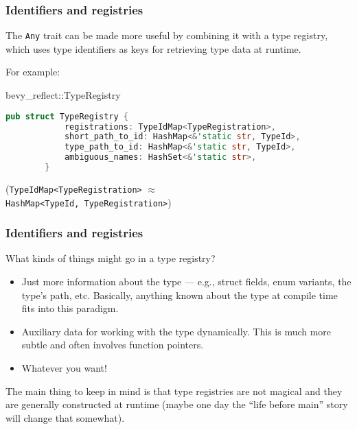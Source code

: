 \documentclass[10pt]{beamer}
\begin{document}
\begin{frame}[fragile]
    \frametitle{Identifiers and registries}
    The \texttt{Any} trait can be made more useful by combining it with a type registry, which uses type identifiers as keys for retrieving type data at runtime. \pause
    
    For example:
    
	\begin{block}{bevy\_reflect::TypeRegistry}
	\begin{lstlisting}[language=Rust, gobble=8]
        pub struct TypeRegistry {
            registrations: TypeIdMap<TypeRegistration>,
            short_path_to_id: HashMap<&'static str, TypeId>,
            type_path_to_id: HashMap<&'static str, TypeId>,
            ambiguous_names: HashSet<&'static str>,
        }
	\end{lstlisting}
	\end{block}
	
	(\texttt{TypeIdMap<TypeRegistration>} $\approx$ \\ \texttt{HashMap<TypeId, TypeRegistration>})
	
\end{frame}

\begin{frame}
    \frametitle{Identifiers and registries}
    What kinds of things might go in a type registry?
    
    \begin{itemize}
        \item Just more information about the type --- e.g., struct fields, enum variants, the type's path, etc. Basically, anything known about the type at compile time fits into this paradigm. \pause
        \item Auxiliary data for working with the type dynamically. This is much more subtle and often involves function pointers. \pause
        \item Whatever you want! \pause
    \end{itemize}
    
    The main thing to keep in mind is that type registries are not magical and they are generally constructed at runtime (maybe one day the ``life before main'' story will change that somewhat). 

\end{frame}
\end{document}
